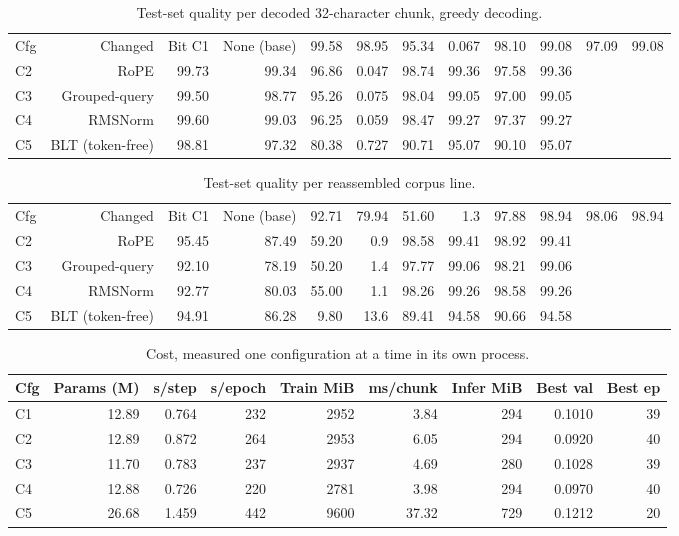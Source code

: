 \begin{table}[t]
\centering
\begin{tabular}{lrrrrrrrrr}
\hline
Cfg & Changed & Bit %
\hline
C1 & None (base) & 99.58 & 98.95 & 95.34 & 0.067 & 98.10 & 99.08 & 97.09 & 99.08 \\
C2 & RoPE & 99.73 & 99.34 & 96.86 & 0.047 & 98.74 & 99.36 & 97.58 & 99.36 \\
C3 & Grouped-query & 99.50 & 98.77 & 95.26 & 0.075 & 98.04 & 99.05 & 97.00 & 99.05 \\
C4 & RMSNorm & 99.60 & 99.03 & 96.25 & 0.059 & 98.47 & 99.27 & 97.37 & 99.27 \\
C5 & BLT (token-free) & 98.81 & 97.32 & 80.38 & 0.727 & 90.71 & 95.07 & 90.10 & 95.07 \\
\hline
\end{tabular}
\caption{Test-set quality per decoded 32-character chunk, greedy decoding.}
\label{tab:quality}
\end{table}

\begin{table}[t]
\centering
\begin{tabular}{lrrrrrrrrr}
\hline
Cfg & Changed & Bit %
\hline
C1 & None (base) & 92.71 & 79.94 & 51.60 & 1.3 & 97.88 & 98.94 & 98.06 & 98.94 \\
C2 & RoPE & 95.45 & 87.49 & 59.20 & 0.9 & 98.58 & 99.41 & 98.92 & 99.41 \\
C3 & Grouped-query & 92.10 & 78.19 & 50.20 & 1.4 & 97.77 & 99.06 & 98.21 & 99.06 \\
C4 & RMSNorm & 92.77 & 80.03 & 55.00 & 1.1 & 98.26 & 99.26 & 98.58 & 99.26 \\
C5 & BLT (token-free) & 94.91 & 86.28 & 9.80 & 13.6 & 89.41 & 94.58 & 90.66 & 94.58 \\
\hline
\end{tabular}
\caption{Test-set quality per reassembled corpus line.}
\label{tab:quality-line}
\end{table}

\begin{table}[t]
\centering
\begin{tabular}{lrrrrrrrr}
\hline
Cfg & Params (M) & s/step & s/epoch & Train MiB & ms/chunk & Infer MiB & Best val & Best ep \\
\hline
C1 & 12.89 & 0.764 & 232 & 2952 & 3.84 & 294 & 0.1010 & 39 \\
C2 & 12.89 & 0.872 & 264 & 2953 & 6.05 & 294 & 0.0920 & 40 \\
C3 & 11.70 & 0.783 & 237 & 2937 & 4.69 & 280 & 0.1028 & 39 \\
C4 & 12.88 & 0.726 & 220 & 2781 & 3.98 & 294 & 0.0970 & 40 \\
C5 & 26.68 & 1.459 & 442 & 9600 & 37.32 & 729 & 0.1212 & 20 \\
\hline
\end{tabular}
\caption{Cost, measured one configuration at a time in its own process.}
\label{tab:cost}
\end{table}
